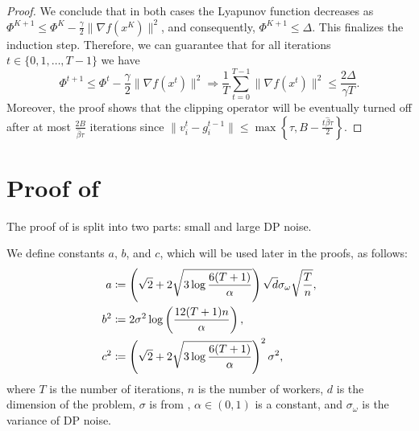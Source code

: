 \documentclass[a4paper,11pt]{article}
\begin{document}
\begin{proof}
    We conclude that in both cases the Lyapunov function decreases as $\Phi^{K+1} \le \Phi^{K} - \frac{\gamma}{2}\|\nabla f(x^{K})\|^2$, and consequently, $\Phi^{K+1} \le \Delta.$ This finalizes the induction step. Therefore, we can guarantee that for all iterations $t\in\{0,1,\ldots, T-1\}$ we have 
    \[
    \Phi^{t+1}\le\Phi^t - \frac{\gamma}{2}\|\nabla f(x^t)\|^2 \Rightarrow \frac{1}{T}\sum_{t=0}^{T-1}\|\nabla f(x^t)\|^2 \le \frac{2\Delta}{\gamma T}.
    \]
    Moreover, the proof shows that the clipping operator will be eventually turned off after at most $\frac{2B}{\hat{\beta}\tau}$ iterations since $\|v_i^t - g_i^{t-1}\| \le \max\left\{\tau, B -\frac{t\hat{\beta}\tau}{2}\right\}$.
\end{proof}





\newpage



\section{Proof of }

The proof of  is split into two parts: small and large DP noise.


We define constants $a$, $b$, and $c$, which will be used later in the proofs, as follows:
\begin{align}\label{eq:constants_a_b_c}
    a &\coloneqq \left(\sqrt{2}+2\sqrt{3\log\frac{6(T+1)}{\alpha}}\right)\sqrt{d}\sigma_{\omega}\sqrt{\frac{T}{n}},\notag\\
    b^2 &\coloneqq  2\sigma^2\log\left(\frac{12(T+1)n}{\alpha}\right),\\
    c^2 &\coloneqq \left(\sqrt{2} + 2\sqrt{3\log\frac{6(T+1)}{\alpha}}\right)^2\sigma^2,\notag
\end{align}
where $T$ is the number of iterations, $n$ is the number of workers, $d$ is the dimension of the problem, $\sigma$ is from , $\alpha\in(0,1)$ is a constant, and $\sigma_{\omega}$ is the variance of DP noise.
\end{document}
